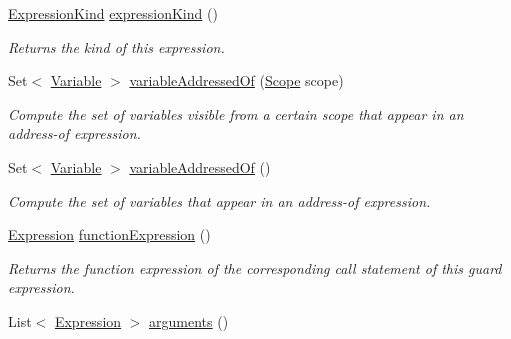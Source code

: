 \begin{DoxyCompactItemize}
\item 
\hyperlink{enumedu_1_1udel_1_1cis_1_1vsl_1_1civl_1_1model_1_1IF_1_1expression_1_1Expression_1_1ExpressionKind}{Expression\+Kind} \hyperlink{classedu_1_1udel_1_1cis_1_1vsl_1_1civl_1_1model_1_1common_1_1expression_1_1CommonFunctionGuardExpression_a2d09d4235afb73ace34178b75fce08b9}{expression\+Kind} ()
\begin{DoxyCompactList}\small\item\em Returns the kind of this expression. \end{DoxyCompactList}\item 
Set$<$ \hyperlink{interfaceedu_1_1udel_1_1cis_1_1vsl_1_1civl_1_1model_1_1IF_1_1variable_1_1Variable}{Variable} $>$ \hyperlink{classedu_1_1udel_1_1cis_1_1vsl_1_1civl_1_1model_1_1common_1_1expression_1_1CommonFunctionGuardExpression_a5677530c7d90e382a749b860c3ac7c11}{variable\+Addressed\+Of} (\hyperlink{interfaceedu_1_1udel_1_1cis_1_1vsl_1_1civl_1_1model_1_1IF_1_1Scope}{Scope} scope)
\begin{DoxyCompactList}\small\item\em Compute the set of variables visible from a certain scope that appear in an address-\/of expression. \end{DoxyCompactList}\item 
Set$<$ \hyperlink{interfaceedu_1_1udel_1_1cis_1_1vsl_1_1civl_1_1model_1_1IF_1_1variable_1_1Variable}{Variable} $>$ \hyperlink{classedu_1_1udel_1_1cis_1_1vsl_1_1civl_1_1model_1_1common_1_1expression_1_1CommonFunctionGuardExpression_ab1fe5005cdf7a162ccd1e0123aedde12}{variable\+Addressed\+Of} ()
\begin{DoxyCompactList}\small\item\em Compute the set of variables that appear in an address-\/of expression. \end{DoxyCompactList}\item 
\hyperlink{interfaceedu_1_1udel_1_1cis_1_1vsl_1_1civl_1_1model_1_1IF_1_1expression_1_1Expression}{Expression} \hyperlink{classedu_1_1udel_1_1cis_1_1vsl_1_1civl_1_1model_1_1common_1_1expression_1_1CommonFunctionGuardExpression_ada1b31d8506f0be705d7882fddf05a2d}{function\+Expression} ()
\begin{DoxyCompactList}\small\item\em Returns the function expression of the corresponding call statement of this guard expression. \end{DoxyCompactList}\item 
List$<$ \hyperlink{interfaceedu_1_1udel_1_1cis_1_1vsl_1_1civl_1_1model_1_1IF_1_1expression_1_1Expression}{Expression} $>$ \hyperlink{classedu_1_1udel_1_1cis_1_1vsl_1_1civl_1_1model_1_1common_1_1expression_1_1CommonFunctionGuardExpression_aa8a210bb5db1a61ef54f7ad10b5707d9}{arguments} ()

\end{DoxyCompactItemize}
